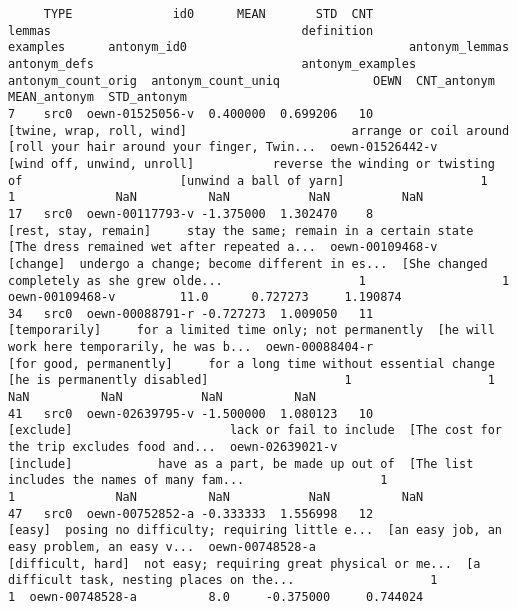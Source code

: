 \documentclass[a4paper,10pt,onecolumn,oneside,openright]{article}
\begin{document}
\begin{verbatim}
     TYPE              id0      MEAN       STD  CNT                                       lemmas                                   definition                                     examples      antonym_id0                               antonym_lemmas                                 antonym_defs                             antonym_examples  antonym_count_orig  antonym_count_uniq             OEWN  CNT_antonym  MEAN_antonym  STD_antonym
7    src0  oewn-01525056-v  0.400000  0.699206   10                    [twine, wrap, roll, wind]                       arrange or coil around  [roll your hair around your finger, Twin...  oewn-01526442-v                   [wind off, unwind, unroll]           reverse the winding or twisting of                      [unwind a ball of yarn]                   1                   1              NaN          NaN           NaN          NaN
17   src0  oewn-00117793-v -1.375000  1.302470    8                         [rest, stay, remain]     stay the same; remain in a certain state  [The dress remained wet after repeated a...  oewn-00109468-v                                     [change]  undergo a change; become different in es...  [She changed completely as she grew olde...                   1                   1  oewn-00109468-v         11.0      0.727273     1.190874
34   src0  oewn-00088791-r -0.727273  1.009050   11                                [temporarily]     for a limited time only; not permanently  [he will work here temporarily, he was b...  oewn-00088404-r                      [for good, permanently]     for a long time without essential change                 [he is permanently disabled]                   1                   1              NaN          NaN           NaN          NaN
41   src0  oewn-02639795-v -1.500000  1.080123   10                                    [exclude]                      lack or fail to include  [The cost for the trip excludes food and...  oewn-02639021-v                                    [include]            have as a part, be made up out of  [The list includes the names of many fam...                   1                   1              NaN          NaN           NaN          NaN
47   src0  oewn-00752852-a -0.333333  1.556998   12                                       [easy]  posing no difficulty; requiring little e...  [an easy job, an easy problem, an easy v...  oewn-00748528-a                            [difficult, hard]  not easy; requiring great physical or me...  [a difficult task, nesting places on the...                   1                   1  oewn-00748528-a          8.0     -0.375000     0.744024

\end{verbatim}
\end{document}
